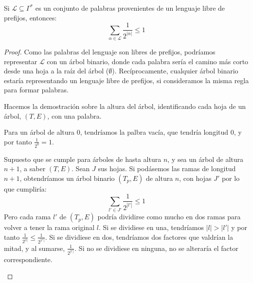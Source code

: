 \begin{lemma}
 Si $\mathcal{L}\subseteq \Gamma^{\ast}$ es un conjunto de palabras provenientes de un lenguaje libre de prefijos, entonces:
 \[
   \sum_{\alpha \in \mathcal{L}} \frac{1}{2^{|\alpha|}} \le 1
 \]
 \label{lemma:kraft}
\end{lemma}
  \begin{proof}
   Como las palabras del lenguaje son libres de prefijos, podríamos representar $\mathcal{L}$ con un árbol binario, donde
   cada palabra sería el camino más corto desde una hoja a la raíz del árbol ($\emptyset$). Recíprocamente, cualquier árbol binario estaría
   representando un lenguaje libre de prefijos, si consideramos la misma regla para formar palabras.
   
   Hacemos la demostración sobre la altura del árbol, identificando cada hoja de un árbol, $(T,E)$, con una palabra.
   
   \begin{subenv}
    Para un árbol de altura $0$, tendríamos la palbra vacía, que tendría longitud $0$, y por tanto $\frac{1}{2^0} = 1$.
    
    Supuesto que se cumple para árboles de hasta altura $n$, y sea un árbol de altura $n+1$, a saber $(T,E)$. Sean $J$ sus hojas.
    Si podásemos las ramas de longitud $n+1$, obtendríamos un árbol binario $(T_p,E)$ de altura $n$, con hojas $J'$ por lo que cumpliría:
    \[
      \sum_{l'\in J'} \frac{1}{2^{|l'|}} \le 1
    \]
    Pero cada rama $l'$ de $(T_p, E)$ podría dividirse como mucho en dos ramas para volver a tener la rama original $l$. Si se dividiese
    en una, tendríamos $|l| > |l'|$ y por tanto $\frac{1}{2^{|l|}} \le \frac{1}{2^{|l'|}}$. Si se dividiese en dos, tendríamos
    dos factores que valdrían la mitad, y al sumarse, $\frac{1}{2^{|l'|}}$. Si no se dividiese en ninguna, no se alteraría
    el factor correspondiente.
   \end{subenv}
  \end{proof}

